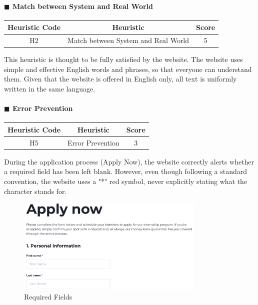 \documentclass[11pt]{article} %
\begin{document}
\paragraph{$\blacksquare$ Match between System and Real World}
\begin{center}
    \begin{tabular}{|c|c|c|} 
    \hline
    \textbf{Heuristic Code} & \textbf{Heuristic} & \textbf{Score}\\ 
    \hline
    H2 & Match between System and Real World & 5 \\
    \hline
    \end{tabular}
\end{center}
This heuristic is thought to be fully satisfied by the website. The website uses simple and effective English words and phrases, so that everyone can understand them. Given that the website is offered in English only, all text is uniformly written in the same language.

\paragraph{$\blacksquare$ Error Prevention}
\begin{center}
    \begin{tabular}{|c|c|c|} 
    \hline
    \textbf{Heuristic Code} & \textbf{Heuristic} & \textbf{Score}\\ 
    \hline
    H5 & Error Prevention & 3 \\
    \hline
    \end{tabular}
\end{center}
During the application process (Apply Now), the website correctly alerts whether a required field has been left blank. However, even though following a standard convention, the website uses a "*" red symbol, never explicitly stating what the character stands for. 

\begin{figure}[H]
  \centering
  \includegraphics[width=0.8\textwidth]{Images/Screenshots/Asterisco Requirements.png}
  \caption{Required Fields}
\end{figure}
\end{document}
